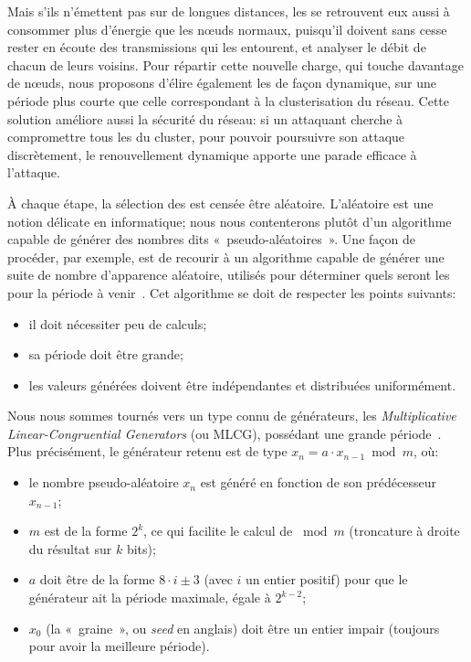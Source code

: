 Mais s'ils n'émettent pas sur de longues distances, les \cns se retrouvent eux aussi à consommer plus d'énergie que les nœuds normaux, puisqu'il doivent sans cesse rester en écoute des transmissions qui les entourent, et analyser le débit de chacun de leurs voisins.
Pour répartir cette nouvelle charge, qui touche davantage de nœuds, nous proposons d'élire également les \cns de façon dynamique, sur une période plus courte que celle correspondant à la clusterisation du réseau.
Cette solution améliore aussi la sécurité du réseau: si un attaquant cherche à compromettre tous les \cns du cluster, pour pouvoir poursuivre son attaque discrètement, le renouvellement dynamique apporte une parade efficace à l'attaque.

À chaque étape, la sélection des \cns est censée être aléatoire.
L'aléatoire est une notion délicate en informatique; nous nous contenterons plutôt d'un algorithme capable de générer des nombres dits «~pseudo-aléatoires~».
Une façon de procéder, par exemple, est de recourir à un algorithme capable de générer une suite de nombre d'apparence aléatoire, utilisés pour déterminer quels seront les \cns pour la période à venir~\cite{GMT12}.
Cet algorithme se doit de respecter les points suivants:
\begin{itemize}
    \item il doit nécessiter peu de calculs;
    \item sa période doit être grande;
    \item les valeurs générées doivent être indépendantes et distribuées uniformément.
\end{itemize}
Nous nous sommes tournés vers un type connu de générateurs, les \textit{Multiplicative Linear-Congruential Generators} (ou MLCG), possédant une grande période~\cite{RJ91}.
Plus précisément, le générateur retenu est de type $x_n = a\cdot x_{n-1}\bmod m$, où:
\begin{itemize}
    \item le nombre pseudo-aléatoire $x_n$ est généré en fonction de son prédécesseur $x_{n-1}$;
    \item $m$ est de la forme $2^k$, ce qui facilite le calcul de $\bmod m$ (troncature à droite du résultat sur $k$ bits);
    \item $a$ doit être de la forme $8\cdot i\pm3$ (avec $i$ un entier positif) pour que le générateur ait la période maximale, égale à $2^{k-2}$;
    \item $x_0$ (la «~graine~», ou \textit{seed} en anglais) doit être un entier impair (toujours pour avoir la meilleure période).
\end{itemize}
